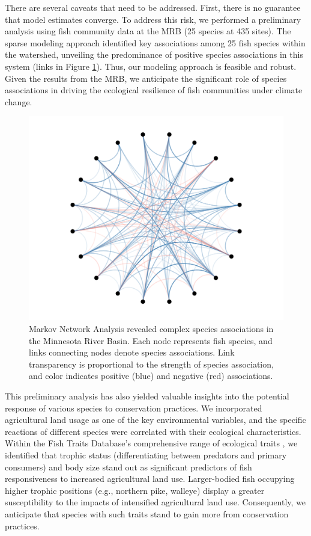 \documentclass[12pt, class=article, crop=false]{standalone}
\begin{document}
There are several caveats that need to be addressed.
First, there is no guarantee that model estimates converge.
To address this risk, we performed a preliminary analysis using fish community data at the MRB (25 species at 435 sites).
The sparse modeling approach identified key associations among 25 fish species within the watershed, unveiling the predominance of positive species associations in this system (links in Figure \ref{fig:fishnet}).
Thus, our modeling approach is feasible and robust.
Given the results from the MRB, we anticipate the significant role of species associations in driving the ecological resilience of fish communities under climate change.

\begin{figure}
    \includegraphics[scale=0.2]{output/fig_fish_network.pdf}
    \caption{Markov Network Analysis revealed complex species associations in the Minnesota River Basin. Each node represents fish species, and links connecting nodes denote species associations. Link transparency is proportional to the strength of species association, and color indicates positive (blue) and negative (red) associations.}
    \label{fig:fishnet}
\end{figure}

This preliminary analysis has also yielded valuable insights into the potential response of various species to conservation practices.
We incorporated agricultural land usage as one of the key environmental variables, and the specific reactions of different species were correlated with their ecological characteristics.
Within the Fish Traits Database's comprehensive range of ecological traits \citep{frimpong_fish_2009}, we identified that trophic status (differentiating between predators and primary consumers) and body size stand out as significant predictors of fish responsiveness to increased agricultural land use.
Larger-bodied fish occupying higher trophic positions (e.g., northern pike, walleye) display a greater susceptibility to the impacts of intensified agricultural land use. 
Consequently, we anticipate that species with such traits stand to gain more from conservation practices.
\end{document}
